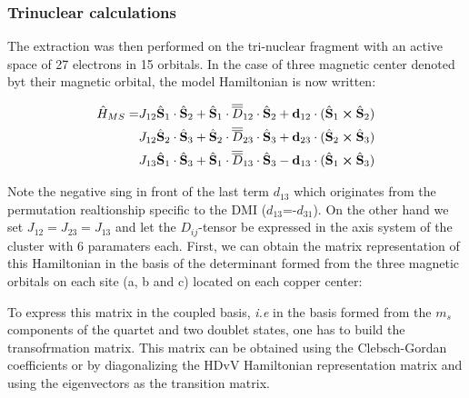 \documentclass[10pt]{report}
\numberwithin{equation}{section}
\begin{document}
\subsubsection*{Trinuclear calculations}

The extraction was then performed on the tri-nuclear fragment with an active space of 27 electrons in 15 orbitals.
In the case of three magnetic center denoted byt their magnetic orbital, the model Hamiltonian is now written:


\begin{equation}
    \begin{split}
    \hat{H}_{MS}=&J_{12} \hat{\vb S}_1 \cdot \hat{\vb S}_2 + \hat{\vb S}_1 \cdot\overline{\overline{D}}_{12} \cdot \hat{\vb S}_2 + \vb{d}_{12} \cdot (\hat{\vb S}_1 \cross \hat{\vb S}_2)\\
    &J_{12} \hat{\vb S}_2 \cdot \hat{\vb S}_3 + \hat{\vb S}_2 \cdot\overline{\overline{D}}_{23} \cdot \hat{\vb S}_3 + \vb{d}_{23} \cdot (\hat{\vb S}_2 \cross \hat{\vb S}_3)\\
    &J_{13} \hat{\vb S}_1 \cdot \hat{\vb S}_3 + \hat{\vb S}_1 \cdot\overline{\overline{D}}_{13} \cdot \hat{\vb S}_3 - \vb{d}_{13} \cdot (\hat{\vb S}_1 \cross \hat{\vb S}_3)
    \end{split}
\end{equation}

Note the negative sing in front of the last term $d_{13}$ which originates from the permutation realtionship specific to the DMI ($d_{13}$=-$d_{31}$). On the other hand we set $J_{12}=J_{23}=J_{13}$ and let the $D_{ij}$-tensor be expressed in the axis system of the cluster with 6 paramaters each.
First, we can obtain the matrix representation of this Hamiltonian in the basis of the determinant formed from the three magnetic orbitals on each site (a, b and c) located on each copper center:


To express this matrix in the coupled basis, \textit{i.e} in the basis formed from the $m_s$ components of the quartet and two doublet states, one has to build the transofrmation matrix.
This matrix can be obtained using the Clebsch-Gordan coefficients or by diagonalizing the HDvV Hamiltonian representation matrix and using the eigenvectors as the transition matrix.
\end{document}
